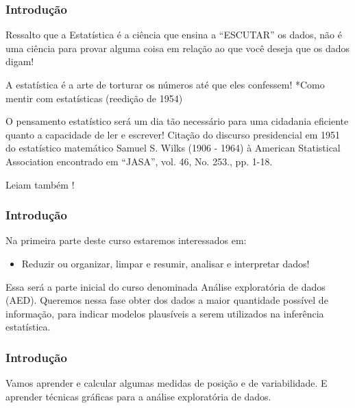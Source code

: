 \documentclass[12pt]{beamer}
\begin{document}
\begin{frame}{}
\frametitle{Introdução}
\begin{block}{}
\justifying
Ressalto que a Estatística é a ciência que ensina a ``ESCUTAR'' os dados, não é uma ciência para provar alguma coisa em relação ao que você deseja que os dados digam!
\end{block}
\pause
\begin{block}{}
\justifying
A estatística é a arte de torturar os números até que eles confessem!
*Como mentir com estatísticas \cite{huff2016mentir} (reedição de 1954)
\end{block}
\pause
\begin{block}{}
\justifying
O pensamento estatístico será um dia tão necessário para uma cidadania eficiente quanto a capacidade de ler e escrever! Citação do discurso presidencial em 1951 do estatístico matemático Samuel S. Wilks (1906 - 1964) à American Statistical Association encontrado em ``JASA'', vol. 46, No. 253., pp. 1-18. 
\end{block}
\pause
\begin{block}{}
\justifying
Leiam também \citet{super16}!
\end{block}
\end{frame}

\begin{frame}{}
\frametitle{Introdução}
\begin{block}{}
\justifying
Na primeira parte deste curso estaremos interessados em:
\begin{itemize}
\item Reduzir ou organizar, limpar e resumir, analisar e interpretar dados!
\end{itemize}
\end{block}
\pause
\begin{block}{}
\justifying
Essa será a parte inicial do curso denominada Análise exploratória de dados (AED). Queremos nessa fase obter dos dados a maior
quantidade possível de informação, para indicar modelos plausíveis a serem utilizados
na inferência estatística.
\end{block}
\end{frame}

\begin{frame}{}
\frametitle{Introdução}
\begin{block}{}
\justifying
Vamos aprender e calcular algumas medidas de posição e de variabilidade. E aprender técnicas gráficas para a análise exploratória de dados. 
\end{block}
\end{frame}
\end{document}
